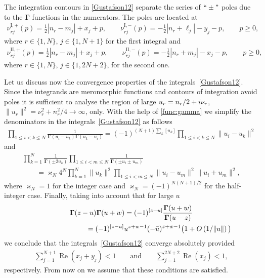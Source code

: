\documentclass[11pt]{article}
\numberwithin{equation}{section}
\numberwithin{equation}{section}
\begin{document}
The integration contours in \eqref{Gustafson12} separate the series of $``\pm"$ poles due to the $\boldsymbol \Gamma$ functions in the numerators. The poles are located at
\begin{gather}\label{poles-I}
\nu^{\text{I},+}_{rj}(p)=\frac12{|n_r-m_j|} +x_j +p, \qquad \nu^{\text{I},-}_{rj}(p)=-\frac12{|n_r+\ell_j|} -y_j -p,
\qquad p\geq 0,
\end{gather}
where $r\in\{1, N\}$, $j\in\{1,N+1\}$ for the first integral and
\begin{gather*}
\nu^{\text{II},+}_{rj}(p)=\frac12{|n_r-m_j|} +x_j +p, \qquad \nu^{\text{II},-}_{rj}(p)=-\frac12{|n_r+m_j|} -x_j -p,\qquad p\geq 0,
\end{gather*}
where $r\in\{1, N\}$, $j\in\{1,2N+2\}$, for the second one.

Let us discuss now the convergence properties of the integrals~\eqref{Gustafson12}. Since the integrands are meromorphic functions and contours of integration avoid poles
it is sufficient to analyse the region of large $u_r=n_r/2+ {\rm i}\nu_r$, $ \|u_r\|^2=\nu_r^2+n_r^2/4 \to\infty$, only.
With the help of \eqref{func:gamma} we simplify the denominators in the integrals~\eqref{Gustafson12} as follows
\begin{gather}\label{den1}
\prod_{1\leq i<k\leq N} \frac1{\boldsymbol{\Gamma}(u_i- u_k)\boldsymbol{\Gamma}(u_k- u_i)} = (-1)^{(N+1)\sum_k [u_k] } \prod_{1\leq i<k\leq N}\|u_i-u_k\|^2
\end{gather}
and
\begin{gather}
\prod_{k=1}^{N}\frac1{\boldsymbol{\Gamma}(\pm 2u_k)} \prod_{1\leq i<m\leq N}\frac1{\boldsymbol \Gamma (\pm u_i\pm u_m)}\nonumber\\
\qquad{} =\varkappa_N 4^{N} \prod_{k=1}^N \|u_k\|^2
\prod_{1\leq i<m\leq N}\|u_i-u_m\|^2\|u_i+u_m\|^2,\label{den2}
\end{gather}
where $\varkappa_N=1$ for the integer case and $\varkappa_N=(-1)^{N(N+1)/2}$ for the half-integer case. Finally, taking
into account that for large $u$
\begin{gather}
\boldsymbol \Gamma(z -u) \boldsymbol \Gamma(u+w) =
(-1)^{[z-u]}\frac{\boldsymbol{\Gamma}(u+w)}{\boldsymbol{\Gamma}(u-z)} \nonumber\\
\hphantom{\boldsymbol \Gamma(z -u) \boldsymbol \Gamma(u+w)}{} = (-1)^{[z-u]}
 u^{z+w-1} (-\bar u)^{\bar z+\bar w -1}\bigl(1+O\left(1/\|u\|\right)\bigl) \label{large-u-as}
\end{gather}
we conclude that the integrals~\eqref{Gustafson12} converge absolutely provided
\begin{gather}\label{convergence}
 \sum_{j=1}^{N+1} \operatorname{Re}(x_j+y_j) <1 \qquad \text{and} \qquad \sum_{j=1}^{2N+2} \operatorname{Re} (x_j) <1,
\end{gather}
respectively. From now on we assume that these conditions are satisfied.
\end{document}
